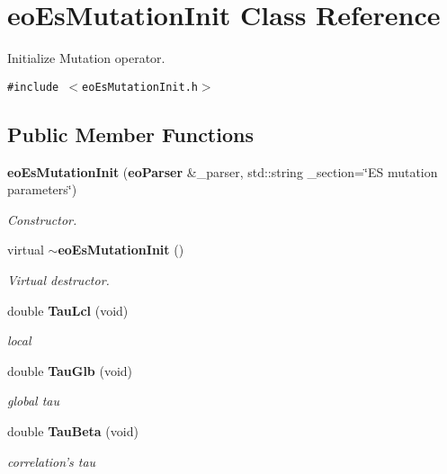 \section{eo\-Es\-Mutation\-Init Class Reference}
\label{classeo_es_mutation_init}
Initialize Mutation operator.  


{\tt \#include $<$eo\-Es\-Mutation\-Init.h$>$}

\subsection*{Public Member Functions}
\begin{CompactItemize}
\item 
{\bf eo\-Es\-Mutation\-Init} ({\bf eo\-Parser} \&\_\-parser, std::string \_\-section=\char`\"{}ES mutation parameters\char`\"{})
\begin{CompactList}\small\item\em Constructor. \item\end{CompactList}\item 
virtual {\bf $\sim$eo\-Es\-Mutation\-Init} ()\label{classeo_es_mutation_init_a1}

\begin{CompactList}\small\item\em Virtual destructor. \item\end{CompactList}\item 
double {\bf Tau\-Lcl} (void)\label{classeo_es_mutation_init_a2}

\begin{CompactList}\small\item\em local  \item\end{CompactList}\item 
double {\bf Tau\-Glb} (void)\label{classeo_es_mutation_init_a3}

\begin{CompactList}\small\item\em global tau \item\end{CompactList}\item 
double {\bf Tau\-Beta} (void)\label{classeo_es_mutation_init_a4}

\begin{CompactList}\small\item\em correlation's tau \item\end{CompactList}\end{CompactItemize}
